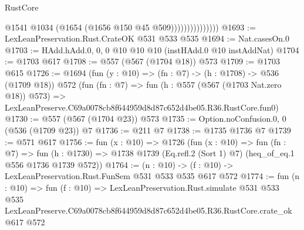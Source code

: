\begin{lexlean}{RustCore}
\begin{coremodule}
                              @1541
                              @1034
                              (@1654 (@1656 @150 @45 @509)))))))))))))))
@1693 := LexLeanPreservation.Rust.CrateOK @531 @533 @535
@1694 := Nat.casesOn.{0}
@1703 := HAdd.hAdd.{0, 0, 0} @10 @10 @10 (instHAdd.{0} @10 instAddNat)
@1704 := @1703 @617
@1708 := @557 (@567 (@1704 @18)) @573
@1709 := @1703 @615
@1726 := @1694
    (fun (y : @10) => (fn : @7) -> (h : @1708) -> @536 (@1709 @18))
    @572
    (fun (fn : @7) =>
    fun (h : @557 (@567 (@1703 Nat.zero @18)) @573) =>
    LexLeanPreserve.C69a0078cb8f644959d8d87c652d4be05.R36.RustCore.fun0)
@1730 := @557 (@567 (@1704 @23)) @573
@1735 := Option.noConfusion.{0, 0} (@536 (@1709 @23)) @7
@1736 := @211 @7
@1738 := @1735 @1736 @7
@1739 := @571 @617
@1756 := fun (x : @10) =>
  @1726
    (fun (x : @10) =>
    fun (fn : @7) =>
    fun (h : @1730) => @1738 @1739 (Eq.refl.{2} (Sort 1) @7) (heq_of_eq.{1} @556 @1736 @1739 @572))
@1764 := (n : @10) -> (f : @10) -> LexLeanPreservation.Rust.FunSem @531 @533 @535 @617 @572
@1774 := fun (n : @10) =>
  fun (f : @10) =>
  LexLeanPreservation.Rust.simulate
    @531
    @533
    @535
    LexLeanPreserve.C69a0078cb8f644959d8d87c652d4be05.R36.RustCore.crate_ok
    @617
    @572
\end{coremodule}
\end{lexlean}
